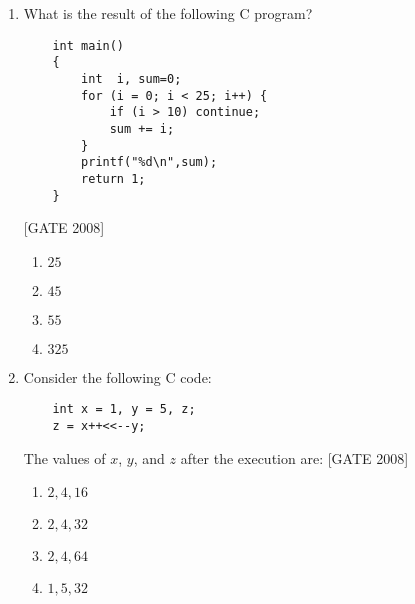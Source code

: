 \documentclass[journal,12pt,onecolumn]{IEEEtran}
\theoremstyle{remark}
\begin{document}
\begin{enumerate}
\begin{verbatim}
    SUBROUTINE SIEDEL(A, C, X, N, IMAX)
    REAL :: SUM
    REAL, DIMENSION(N,N) :: A
    REAL, DIMENSION(N) :: C, X
    DO K = 1, IMAX
        DO I = 1, N
            SUM = 0.0
            DO J = 1, N
                IF (I /= J) THEN
                    SUM = SUM + A(I,J)*X(J)
                ENDIF
            ENDDO
            ******
        ENDDO
    ENDDO
    END SUBROUTINE SIEDEL
\end{verbatim}

The missing statement in the program, indicated by `******`, is:\hfill{[GATE 2008]}

\begin{multicols}{4}
\begin{enumerate}
    \item $ X(I) = C(I) + SUM $
    \item $ X(I) = C(I) - SUM $
    \item $ X(I) = \frac{C(I) + SUM}{A(I,I)} $
    \item $ X(I) = \frac{C(I) - SUM}{A(I,I)} $
\end{enumerate}
\end{multicols}

\item What is the result of the following C program?

\begin{verbatim}
    int main()
    {
        int  i, sum=0;
        for (i = 0; i < 25; i++) {
            if (i > 10) continue;
            sum += i;
        }
        printf("%d\n",sum);
        return 1;
    }
\end{verbatim}
\hfill{[GATE 2008]}

\begin{multicols}{4}
\begin{enumerate}
    \item $ 25 $
    \item $ 45 $
    \item $ 55 $
    \item $ 325 $
\end{enumerate}
\end{multicols}

\item Consider the following C code:

\begin{verbatim}
    int x = 1, y = 5, z;
    z = x++<<--y;
\end{verbatim}

The values of $ x $, $ y$, and $ z$ after the execution are:
\hfill{[GATE 2008]}
\begin{multicols}{4}
\begin{enumerate}
    \item $ 2, 4, 16 $
    \item $ 2, 4, 32 $
    \item $ 2, 4, 64 $
    \item $ 1, 5, 32 $
\end{enumerate}
\end{multicols}


\end{enumerate}
\end{document}
